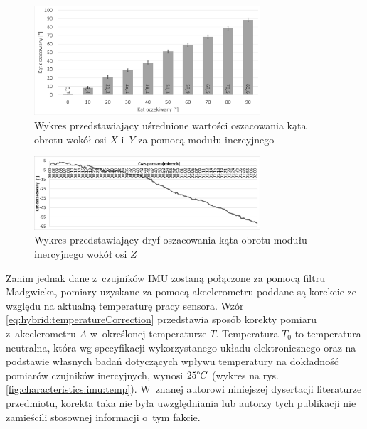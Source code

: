 \begin{figure}[!htb]
							
	\centering 
	\includegraphics[width=0.75\textwidth]{images/imumeasuredAngles.png}
	\caption{Wykres przedstawiający uśrednione wartości oszacowania kąta obrotu wokół osi $X$ i~$Y$ za pomocą modułu inercyjnego}
	\label{fig:hybrid:imu:XYRot}
\end{figure}
\begin{figure}[!htb]
	\centering 
	\includegraphics[width=0.75\textwidth]{images/imuDrift.png}
	\caption{Wykres przedstawiający dryf oszacowania kąta obrotu modułu inercyjnego wokół osi $Z$}
	\label{fig:hybrid:imu:drift}
						
\end{figure}

Zanim jednak dane z~czujników IMU zostaną połączone za pomocą filtru Madgwicka, pomiary uzyskane za pomocą akcelerometru poddane są korekcie ze względu na aktualną temperaturę pracy sensora. Wzór \ref{eq:hybrid:temperatureCorrection} przedstawia sposób korekty pomiaru z~akcelerometru  $A$ w~określonej temperaturze $T$. Temperatura $T_0$ to temperatura neutralna, która wg specyfikacji wykorzystanego układu elektronicznego oraz na podstawie własnych badań 
dotyczących wpływu temperatury na dokładność pomiarów czujników inercyjnych, wynosi $25\degree C$ (wykres na rys. \ref{fig:characteristics:imu:temp}). W~znanej autorowi niniejszej dysertacji literaturze przedmiotu, korekta taka nie była uwzględniania lub autorzy tych publikacji nie zamieścili stosownej informacji o~tym fakcie.


